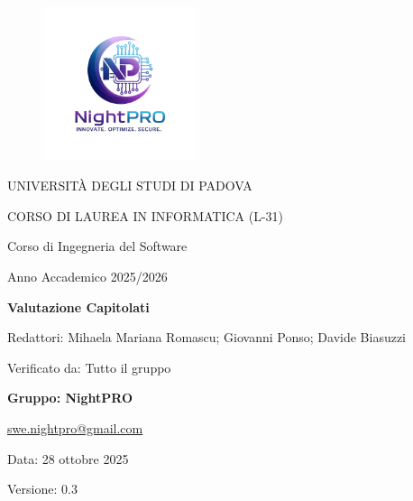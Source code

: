 \documentclass[a4paper, 11pt, oneside]{scrartcl} %
\begin{document}
\thispagestyle{empty}
\begin{titlepage}
    \centering
    
\begin{figure}
    \centering
    \includegraphics[width=0.4\textwidth]{logo.jpg}
\end{figure}

    \vfill
    
    {\small UNIVERSITÀ DEGLI STUDI DI PADOVA \par}
    {\small CORSO DI LAUREA IN INFORMATICA (L-31) \par}
    \vspace{0.5cm}
    {\large Corso di Ingegneria del Software \par}
    {\small Anno Accademico 2025/2026 \par}


    
    \vfill
    
    {\Huge \bfseries Valutazione Capitolati \par}
    
    \vspace{1cm}
    
    {\Large Redattori: Mihaela Mariana Romascu; Giovanni Ponso; Davide Biasuzzi \par} 
    {\Large Verificato da: Tutto il gruppo  \par} 
    
    \vfill
    
    {\Large \bfseries Gruppo: NightPRO \par}
    \vspace{0.5cm}
    {\large \href{mailto:swe.nightpro@gmail.com}{swe.nightpro@gmail.com} \par}
    
    \vfill
    
    {\large Data: 28 ottobre 2025 \par}
    {\Large Versione: 0.3 \par} 

\end{titlepage}
\end{document}
